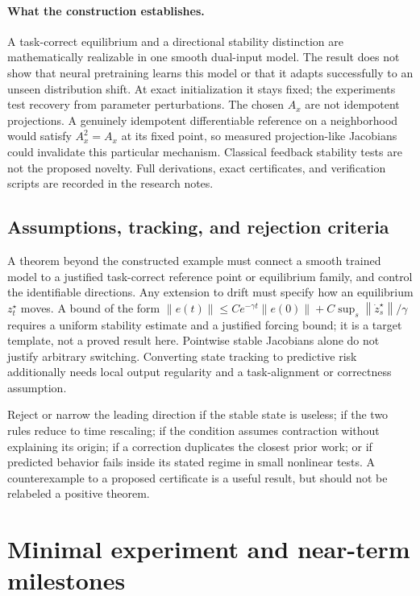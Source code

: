 \documentclass[11pt,a4paper]{article}
\newcommand{\norm}[1]{\left\lVert #1\right\rVert}
\begin{document}
\paragraph{What the construction establishes.}
A task-correct equilibrium and a directional stability distinction are
mathematically realizable in one smooth dual-input model. The result
does not show that neural pretraining learns this model or that it adapts
successfully to an unseen distribution shift. At exact initialization
it stays fixed; the experiments test recovery from parameter perturbations.
The chosen $A_x$ are not idempotent projections. A genuinely idempotent
differentiable reference on a neighborhood would satisfy $A_x^2=A_x$
at its fixed point, so measured projection-like Jacobians could invalidate
this particular mechanism. Classical feedback stability tests are not
the proposed novelty. Full derivations, exact certificates, and verification
scripts are recorded in the research notes.

\subsection{Assumptions, tracking, and rejection criteria}
A theorem beyond the constructed example must connect a smooth trained
model to a justified task-correct reference point or equilibrium family,
and control the identifiable directions. Any extension to drift must specify how an
equilibrium $z_t^\star$ moves. A bound of the form
$\norm{e(t)}\le C e^{-\gamma t}\norm{e(0)}+
C\sup_s\norm{\dot z_s^\star}/\gamma$
requires a uniform stability estimate and a justified forcing bound;
it is a target template, not a proved result here. Pointwise stable
Jacobians alone do not justify arbitrary switching. Converting state
tracking to predictive risk additionally needs local output regularity
and a task-alignment or correctness assumption.

Reject or narrow the leading direction if the stable state is useless;
if the two rules reduce to time rescaling; if the condition assumes
contraction without explaining its origin; if a correction duplicates
the closest prior work; or if predicted behavior fails inside its stated
regime in small nonlinear tests. A counterexample to a proposed certificate
is a useful result, but should not be relabeled a positive theorem.

\section{Minimal experiment and near-term milestones}
\end{document}
